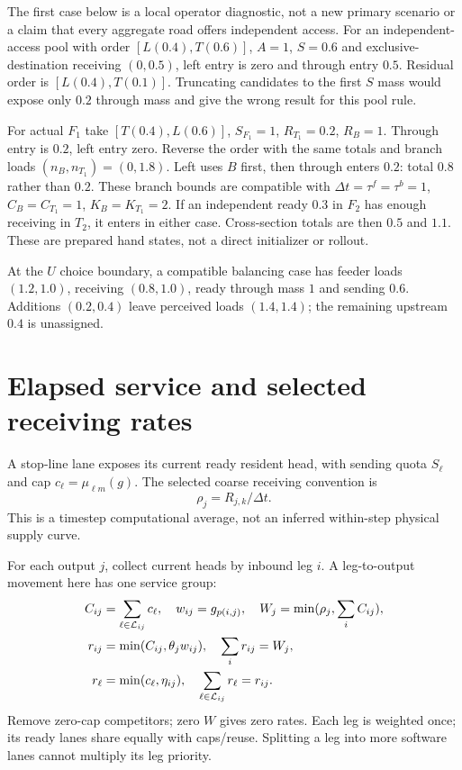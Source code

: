 \documentclass[10pt,a4paper]{article}
\begin{document}
The first case below is a local operator diagnostic, not a new primary
scenario or a claim that every aggregate road offers independent access.
For an independent-access pool with order $[L(0.4),T(0.6)]$, $A=1$,
$S=0.6$ and exclusive-destination receiving $(0,0.5)$, left entry is
zero and through entry $0.5$. Residual order is $[L(0.4),T(0.1)]$.
Truncating candidates to the first $S$ mass would expose only $0.2$
through mass and give the wrong result for this pool rule.

For actual $F_1$ take $[T(0.4),L(0.6)]$, $S_{F_1}=1$, $R_{T_1}=0.2$,
$R_B=1$. Through entry is $0.2$, left entry zero.
Reverse the order with the same totals and branch loads
$(n_B,n_{T_1})=(0,1.8)$. Left uses $B$ first, then through enters $0.2$:
total $0.8$ rather than $0.2$.
These branch bounds are compatible with
$\Delta t=\tau^f=\tau^b=1$, $C_B=C_{T_1}=1$, $K_B=K_{T_1}=2$.
If an independent ready $0.3$ in $F_2$ has enough receiving in $T_2$,
it enters in either case. Cross-section totals are then $0.5$ and $1.1$.
These are prepared hand states, not a direct initializer or rollout.

At the $U$ choice boundary, a compatible balancing case has feeder loads
$(1.2,1.0)$, receiving $(0.8,1.0)$, ready through mass $1$ and sending $0.6$.
Additions $(0.2,0.4)$ leave perceived loads $(1.4,1.4)$;
the remaining upstream $0.4$ is unassigned.

\section{Elapsed service and selected receiving rates}

A stop-line lane exposes its current ready resident head, with sending
quota $S_\ell$ and cap $c_\ell=\mu_{\ell m}(g)$.
The selected coarse receiving convention is
\begin{equation}
 \rho_j=R_{j,k}/\Delta t .
 \label{eq:receiving-rate}
\end{equation}
This is a timestep computational average, not an inferred within-step
physical supply curve.

For each output $j$, collect current heads by inbound leg $i$.
A leg-to-output movement here has one service group:
\begin{align}
 C_{ij}&=\sum_{\ell\in{\cal L}_{ij}}c_\ell,\quad
 w_{ij}=g_{p(i,j)},\quad W_j=\min(\rho_j,\sum_iC_{ij}),\nonumber\\
 r_{ij}&=\min(C_{ij},\theta_jw_{ij}),\quad
                    \sum_i r_{ij}=W_j,\label{eq:leg-sharing}\\
 r_\ell&=\min(c_\ell,\eta_{ij}),\quad
                    \sum_{\ell\in{\cal L}_{ij}}r_\ell=r_{ij}.
 \label{eq:lane-sharing}
\end{align}
Remove zero-cap competitors; zero $W$ gives zero rates.
Each leg is weighted once; its ready lanes share equally with caps/reuse.
Splitting a leg into more software lanes cannot multiply its leg priority.
\end{document}
